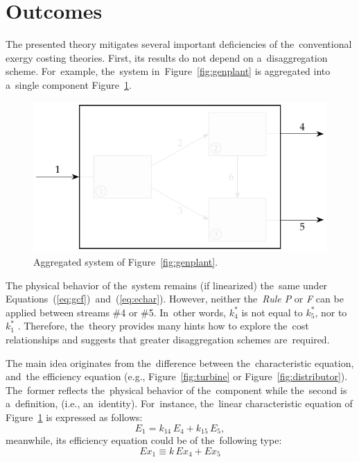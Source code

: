 \documentclass[energies,article,accept,moreauthors,pdftex]{Definitions/mdpi}
\begin{document}
\section{Outcomes}
The presented theory mitigates several important deficiencies of the~conventional exergy costing theories. First, its results do not depend on a~disaggregation scheme. For~example, the~system in~Figure~\ref{fig:genplant} is aggregated into a~single component Figure~\ref{fig:genplanta}.

\begin{figure}[H]
    \centering
    \includegraphics[scale=0.9]{genplanta}
    \caption{Aggregated system of Figure~\ref{fig:genplant}.}
    \label{fig:genplanta}
\end{figure}
The physical behavior of the~system remains (if linearized) the~same under Equations~(\ref{eq:gcf})~and~(\ref{eq:echar}). However, neither the~\emph{Rule P} or \emph{F} can be applied between streams \#4 or \#5. In~other words, $k_4^*$ is not equal to $k_5^*$, nor to $k_1^*$ . Therefore, the~theory provides many hints how to explore the~cost relationships and suggests that greater disaggregation schemes are~required.

The main idea originates from the~difference between the~characteristic equation, and~the efficiency equation (e.g., Figure~\ref{fig:turbine} or Figure~\ref{fig:distributor}). The~former reflects the~physical behavior of the~component while the~second is a~definition, (i.e., an~identity). For~instance, the~linear characteristic equation of Figure~\ref{fig:genplanta} is expressed as follows:
\[
    E_1=k_{14}\,E_4 + k_{15}\,E_5,
\]
meanwhile, its efficiency equation could be of the~following type:
\[
   Ex_{1} \equiv k\,Ex_{4}+Ex_{5}
\]

\end{document}
